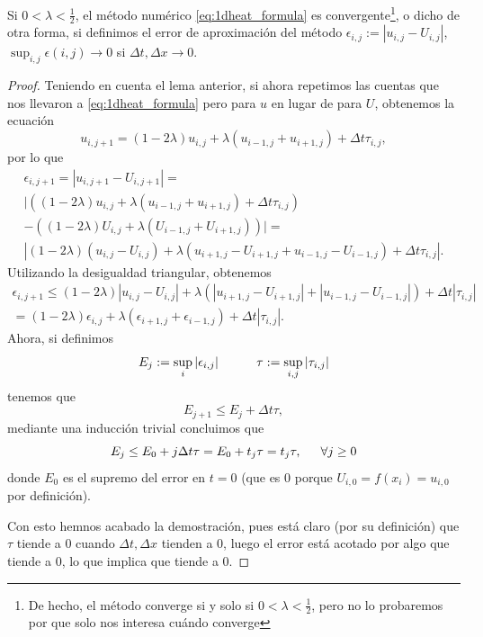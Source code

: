 

\begin{teorema}
	Si $0<\lambda<\frac{1}{2}$, el método numérico \eqref{eq:1dheat_formula} es convergente\footnote{De hecho, el método converge si y solo si $0<\lambda<\frac{1}{2}$, pero no lo probaremos por que solo nos interesa cuándo converge}, o dicho de otra forma, si definimos el error de aproximación del método $\epsilon_{i,j}:=|u_{i,j}-U_{i,j}|$, $\sup_{i,j}\epsilon(i,j)\rightarrow0$ si $\Delta t, \Delta x \rightarrow 0$.
\end{teorema}

\begin{proof}
	Teniendo en cuenta el lema anterior, si ahora repetimos las cuentas que nos llevaron a \eqref{eq:1dheat_formula} pero para $u$ en lugar de para $U$, obtenemos la ecuación
	\begin{equation}
		u_{i,j+1} = (1-2\lambda)u_{i,j}+\lambda(u_{i-1,j}+u_{i+1,j})+\Delta t\tau_{i,j},
	\end{equation}
	por lo que
	\begin{gather}
		\epsilon_{i,j+1} = |u_{i,j+1}-U_{i,j+1}| = \\ |((1-2\lambda)u_{i,j}+\lambda(u_{i-1,j}+u_{i+1,j})+\Delta t\tau_{i,j}) \\
		 - ((1-2\lambda)U_{i,j}+\lambda(U_{i-1,j}+U_{i+1,j}))| = \\
		 |(1-2\lambda)(u_{i,j}-U_{i,j})+\lambda(u_{i+1,j}-U_{i+1,j}+u_{i-1,j}-U_{i-1,j}) + \Delta t\tau_{i,j}|.
	\end{gather}
	Utilizando la desigualdad triangular, obtenemos
	\begin{multline}
		\epsilon_{i,j+1} \leq (1-2\lambda)|u_{i,j}-U_{i,j}|+\lambda(|u_{i+1,j}-U_{i+1,j}|+|u_{i-1,j}-U_{i-1,j}|) + \Delta t|\tau_{i,j}| \\
		= (1-2\lambda)\epsilon_{i,j}+\lambda(\epsilon_{i+1,j}+\epsilon_{i-1,j}) + \Delta t|\tau_{i,j}|.
	\end{multline}
	Ahora, si definimos
	\begin{equation}
		E_j:=\sup_{i}|\epsilon_{i,j}|\hspace{30px}\tau:=\sup_{i,j}|\tau_{i,j}|
	\end{equation}
	tenemos que
	\begin{equation}
		E_{j+1}\leq E_j+\Delta t\tau,
	\end{equation}
	mediante una inducción trivial concluimos que
	\begin{equation}
		E_j \leq E_0 + j\Delta t\tau = E_0+t_j\tau = t_j\tau,\hspace{15px}\forall j\geq0
	\end{equation}
	donde $E_0$ es el supremo del error en $t=0$ (que es $0$ porque $U_{i,0} =f(x_i)= u_{i,0}$ por definición).
	
	Con esto hemnos acabado la demostración, pues está claro (por su definición) que $\tau$ tiende a 0 cuando $\Delta t, \Delta x$ tienden a 0, luego el error está acotado por algo que tiende a 0, lo que implica que tiende a 0.
\end{proof}

